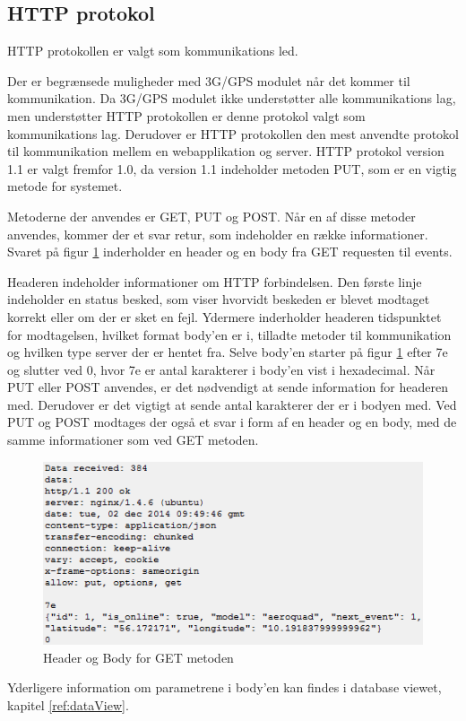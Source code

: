 \subsection{HTTP protokol}
HTTP protokollen er valgt som kommunikations led. 

Der er begrænsede muligheder med 3G/GPS modulet når det kommer til kommunikation. 
Da 3G/GPS modulet ikke understøtter alle kommunikations lag, men understøtter HTTP protokollen er denne protokol valgt som kommunikations lag.
Derudover er HTTP protokollen den mest anvendte protokol til kommunikation mellem en webapplikation og server.
HTTP protokol version 1.1 er valgt fremfor 1.0, da version 1.1 indeholder metoden PUT, som er en vigtig metode for systemet.

Metoderne der anvendes er GET, PUT og POST. Når en af disse metoder anvendes, kommer der et svar retur, som indeholder en række informationer.
Svaret på figur \ref{fig:headerbodyget} inderholder en header og en body fra GET requesten til events.  

Headeren indeholder informationer om HTTP forbindelsen. Den første linje indeholder en status besked, som viser hvorvidt beskeden er blevet modtaget korrekt eller om der er sket en fejl. Ydermere inderholder headeren tidspunktet for modtagelsen, hvilket format body'en er i, tilladte metoder til kommunikation og hvilken type server der er hentet fra. Selve body'en starter på figur \ref{fig:headerbodyget} efter 7e og slutter ved 0, hvor 7e er antal karakterer i body'en vist i hexadecimal. Når PUT eller POST anvendes, er det nødvendigt at sende information for headeren med. Derudover er det vigtigt at sende antal karakterer der er i bodyen med. Ved PUT og POST modtages der også et svar i form af en header og en body, med de samme informationer som ved GET metoden. 
\begin{figure}[H]
	\centering
	\includegraphics[width=1\textwidth]{Billeder/header_body_get.png}
	\caption{Header og Body for GET metoden}
	\label{fig:headerbodyget}
\end{figure}
Yderligere information om parametrene i body'en kan findes i database viewet, kapitel \ref{ref:dataView}.
